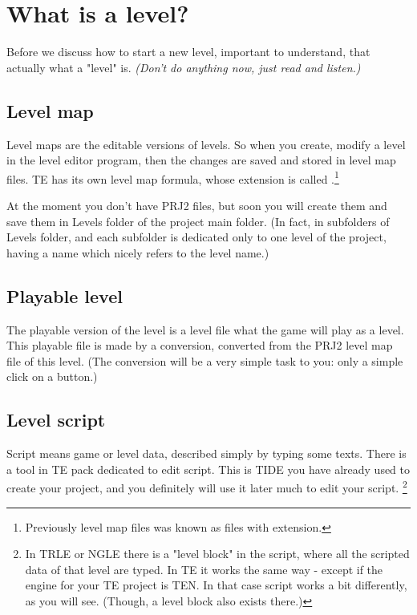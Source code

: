 \chapter{What is a level?}
Before we discuss how to start a new level, important to understand, that actually what a "level" is.
\emph{(Don't do anything now, just read and listen.)}
\section{Level map}
Level maps are the editable versions of levels. So when you create, modify a level in the level editor program, then the changes are saved and stored in level map files.
 TE has its own level map formula, whose extension is called .\footnote{Previously level map files was known as files with  extension.}
 \par At the moment you don't have PRJ2 files, but soon you will create them and save them in Levels folder of the project main folder. (In fact, in subfolders of Levels folder, and each subfolder is dedicated only to one level of the project, having a name which nicely refers to the level name.)
 \section{Playable level}
 The playable version of the level is a level file what the game will play as a level. This playable file is made by a conversion, converted from the PRJ2 level map file of this level. (The conversion will be a very simple task to you: only a simple click on a button.)
 \section{Level script}
Script means game or level data, described simply by typing some texts.
There is a tool in TE pack dedicated to edit script. This is TIDE you have already used to create your project, and you definitely will use it later much to edit your script. \footnote{In TRLE or NGLE there is a "level block" in the script, where all the scripted data of that level are typed. In TE it works the same way - except if the engine for your TE project is TEN. In that case script works a bit differently, as you will see. (Though, a level block also exists there.)}
